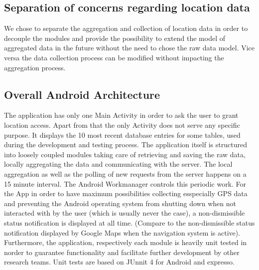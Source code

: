 \subsection{Separation of concerns regarding location data}
We chose to separate the aggregation and collection of location data in order to decouple the modules and provide the possibility to extend the model of aggregated data in the future without the need to chose the raw data model. Vice versa the data collection process can be modified without impacting the aggregation process.

\subsection{Overall Android Architecture}
The application has only one Main Activity in order to ask the user to grant location access. Apart from that the only Activity does not serve any specific purpose. It displays the 10 most recent database entries for some tables, used during the development and testing process.
The application itself is structured into loosely coupled modules taking care of retrieving and saving the raw data, locally aggregating the data and communicating with the server.
The local aggregation as well as the polling of new requests from the server happens on a 15 minute interval. The Android Workmanager controls this periodic work.
For the App in order to have maximum possibilities collecting esspecially GPS data and preventing the Android operating system from shutting down when not interacted with by the user (which is usually never the case), a non-dismissible status notification is displayed at all time. (Compare to the non-dismissible status notification displayed by Google Maps when the navigation system is active).
Furthermore, the application, respectively each module is heavily unit tested in norder to guarantee functionality and facilitate further development by other research teams. Unit tests are based on JUnnit 4 for Android and expresso.